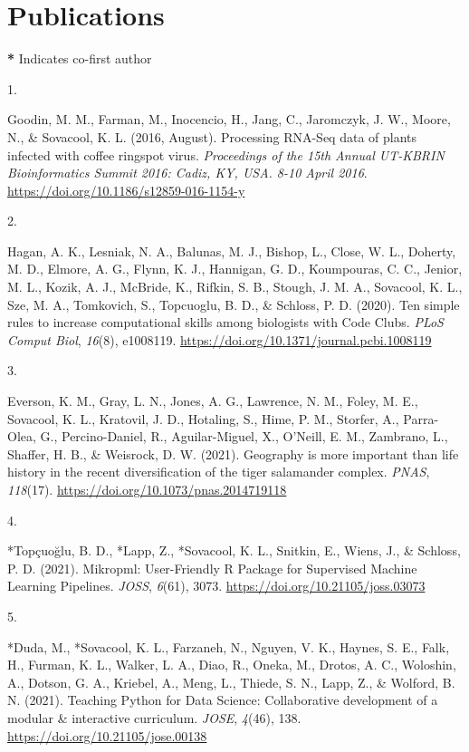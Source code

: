 \documentclass[12pt,a4paper,]{moderncv}
\newlength{\csllabelwidth}
\newcommand{\CSLLeftMargin}[1]{\parbox[t]{\csllabelwidth}{#1}}
\newcommand{\CSLRightInline}[1]{\parbox[t]{\linewidth - \csllabelwidth}{#1}}
\begin{document}
\hypertarget{publications}{%
\section{Publications}\label{publications}}

\textbf{*} Indicates co-first author

\hypertarget{bibliography}{}
\leavevmode{}%
\CSLLeftMargin{1. }%
\CSLRightInline{Goodin, M. M., Farman, M., Inocencio, H., Jang, C.,
Jaromczyk, J. W., Moore, N., \& Sovacool, K. L. (2016, August).
Processing RNA-Seq data of plants infected with coffee ringspot virus.
\emph{Proceedings of the 15th Annual UT-KBRIN Bioinformatics Summit
2016: Cadiz, KY, USA. 8-10 April 2016}.
\url{https://doi.org/10.1186/s12859-016-1154-y}}

\leavevmode{}%
\CSLLeftMargin{2. }%
\CSLRightInline{Hagan, A. K., Lesniak, N. A., Balunas, M. J., Bishop,
L., Close, W. L., Doherty, M. D., Elmore, A. G., Flynn, K. J., Hannigan,
G. D., Koumpouras, C. C., Jenior, M. L., Kozik, A. J., McBride, K.,
Rifkin, S. B., Stough, J. M. A., Sovacool, K. L., Sze, M. A., Tomkovich,
S., Topcuoglu, B. D., \& Schloss, P. D. (2020). Ten simple rules to
increase computational skills among biologists with Code Clubs.
\emph{PLoS Comput Biol}, \emph{16}(8), e1008119.
\url{https://doi.org/10.1371/journal.pcbi.1008119}}

\leavevmode{}%
\CSLLeftMargin{3. }%
\CSLRightInline{Everson, K. M., Gray, L. N., Jones, A. G., Lawrence, N.
M., Foley, M. E., Sovacool, K. L., Kratovil, J. D., Hotaling, S., Hime,
P. M., Storfer, A., Parra-Olea, G., Percino-Daniel, R., Aguilar-Miguel,
X., O'Neill, E. M., Zambrano, L., Shaffer, H. B., \& Weisrock, D. W.
(2021). Geography is more important than life history in the recent
diversification of the tiger salamander complex. \emph{PNAS},
\emph{118}(17). \url{https://doi.org/10.1073/pnas.2014719118}}

\leavevmode{}%
\CSLLeftMargin{4. }%
\CSLRightInline{*Topçuoğlu, B. D., *Lapp, Z., *Sovacool, K. L., Snitkin,
E., Wiens, J., \& Schloss, P. D. (2021). Mikropml: User-Friendly R
Package for Supervised Machine Learning Pipelines. \emph{JOSS},
\emph{6}(61), 3073. \url{https://doi.org/10.21105/joss.03073}}

\leavevmode{}%
\CSLLeftMargin{5. }%
\CSLRightInline{*Duda, M., *Sovacool, K. L., Farzaneh, N., Nguyen, V.
K., Haynes, S. E., Falk, H., Furman, K. L., Walker, L. A., Diao, R.,
Oneka, M., Drotos, A. C., Woloshin, A., Dotson, G. A., Kriebel, A.,
Meng, L., Thiede, S. N., Lapp, Z., \& Wolford, B. N. (2021). Teaching
Python for Data Science: Collaborative development of a modular \&
interactive curriculum. \emph{JOSE}, \emph{4}(46), 138.
\url{https://doi.org/10.21105/jose.00138}}
\end{document}
